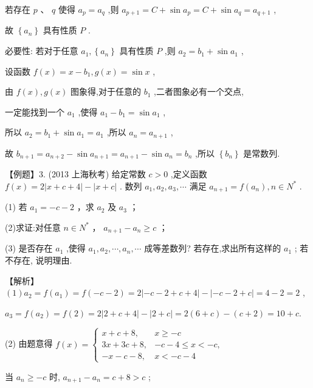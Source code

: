 \documentclass[10pt]{article}
\begin{document}
若存在 \(p\text{ 、 }q\) 使得 \({a}_{p} = {a}_{q}\) ,则 \({a}_{p + 1} = C + \sin {a}_{p} = C + \sin {a}_{q} = {a}_{q + 1}\) ,

故 \(\left\{  {a}_{n}\right\}\) 具有性质 \(P\) .

必要性: 若对于任意 \({a}_{1},\left\{  {a}_{n}\right\}\) 具有性质 \(P\) ,则 \({a}_{2} = {b}_{1} + \sin {a}_{1}\) ,

设函数 \(f\left( x\right)  = x - {b}_{1},g\left( x\right)  = \sin x\) ,

由 \(f\left( x\right) ,g\left( x\right)\) 图象得,对于任意的 \({b}_{1}\) ,二者图象必有一个交点,

一定能找到一个 \({a}_{1}\) ,使得 \({a}_{1} - {b}_{1} = \sin {a}_{1}\) ,

所以 \({a}_{2} = {b}_{1} + \sin {a}_{1} = {a}_{1}\) ,所以 \({a}_{n} = {a}_{n + 1}\) ,

故 \({b}_{n + 1} = {a}_{n + 2} - \sin {a}_{n + 1} = {a}_{n + 1} - \sin {a}_{n} = {b}_{n}\) ,所以 \(\left\{  {b}_{n}\right\}\) 是常数列.

【例题】3. (2013 上海秋考) 给定常数 \(c > 0\) ,定义函数 \(f\left( x\right)  = 2\left| {x + c + 4}\right|  - \left| {x + c}\right|\) . 数列 \({a}_{1},{a}_{2},{a}_{3},\cdots\) 满足 \({a}_{n + 1} = f\left( {a}_{n}\right) ,n \in  {N}^{ * }\) .

(1) 若 \({a}_{1} =  - c - 2\) ，求 \({a}_{2}\) 及 \({a}_{3}\) ；

(2)求证:对任意 \(n \in  {N}^{ * }\) ， \({a}_{n + 1} - {a}_{n} \geq  c\) ；

(3) 是否存在 \({a}_{1}\) ,使得 \({a}_{1},{a}_{2},\cdots ,{a}_{n},\cdots\) 成等差数列? 若存在,求出所有这样的 \({a}_{1}\) ; 若不存在, 说明理由.

【解析】 \(\left( 1\right) {a}_{2} = f\left( {a}_{1}\right)  = f\left( {-c - 2}\right)  = 2\left| {-c - 2 + c + 4}\right|  - \left| {-c - 2 + c}\right|  = 4 - 2 = 2\) ,

\({a}_{3} = f\left( {a}_{2}\right)  = f\left( 2\right)  = 2\left| {2 + c + 4}\right|  - \left| {2 + c}\right|  = 2\left( {6 + c}\right)  - \left( {c + 2}\right)  = {10} + c.\)

(2) 由题意得 \(f\left( x\right)  = \left\{  \begin{array}{ll} x + c + 8, & x \geq   - c \\  {3x} + {3c} + 8, &  - c - 4 \leq  x <  - c, \\   - x - c - 8, & x <  - c - 4 \end{array}\right.\)

当 \({a}_{n} \geq   - c\) 时, \({a}_{n + 1} - {a}_{n} = c + 8 > c\) ;
\end{document}
